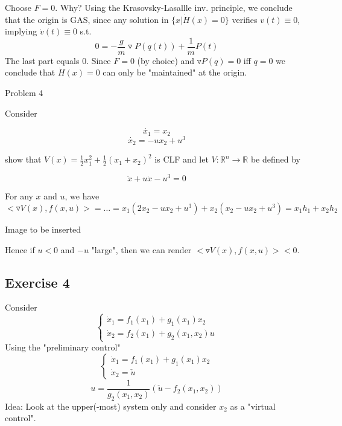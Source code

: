 Choose $F = 0$. Why? Using the Krasovsky-Lasallle inv. principle, we conclude that the origin is GAS, since any solution in $\{ x| \dot{H}(x) = 0 \}$ verifies $v(t) \equiv 0$, implying $\dot{v}(t) \equiv 0$ s.t. 
\begin{equation*}
0 = - \frac{g}{m} \triangledown P(q(t)) + \frac{1}{m} P(t)
\end{equation*}
The last part equals 0.  Since $F = 0$ (by choice) and $\triangledown P(q) = 0$ iff $q = 0$ we conclude that $\dot{H}(x) = 0$ can only be "maintained" at the origin.

Problem 4

Consider 

\begin{equation*}
\dot{x_1} = x_2
\end{equation*}
\begin{equation*}
\dot{x_2} = - ux_2 + u^3
\end{equation*}

show that $V(x) = \frac{1}{2} x_1^2 + \frac{1}{2}(x_1 +x_2)^2$ is CLF and let $V: \mathbb{R}^n \to \mathbb{R}$ be defined by

\begin{equation*}
\ddot{x} + u\dot{x} - u^3 = 0
\end{equation*}

For any $x$ and $u$, we have $<\triangledown V(x), f(x,u)> = \dots = x_1(2x_2 -ux_2 + u^3) + x_2(x_2 - ux_2 + u^3) = x_1h_1 + x_2h_2$

Image to be inserted

Hence if $u < 0$ and $-u$ "large", then we can render $<\triangledown V(x), f(x,u)> < 0$.

   
    \subsection{Exercise 4}
    
    Consider
    \begin{equation} \label{ex:4:theory:1}
    \left\{\begin{array}{ll}
        \dot x_1 = f_1(x_1)+g_1(x_1)x_2 \\
        \dot x_2 = f_2(x_1)+g_2(x_1,x_2)u
    \end{array} \right.
    \end{equation}
    Using the "preliminary control"
    \begin{equation} \label{ex:4:theory:2}
    \left\{\begin{array}{ll}
        \dot x_1 = f_1(x_1)+g_1(x_1)x_2 \\
        \dot x_2 = \check u
    \end{array} \right.
    \end{equation}
    $$u=\frac{1}{g_2(x_1,x_2)}(\check u - f_2(x_1,x_2))$$
    Idea: Look at the upper(-most) system only and consider $x_2$ as a "virtual control". \\
    
